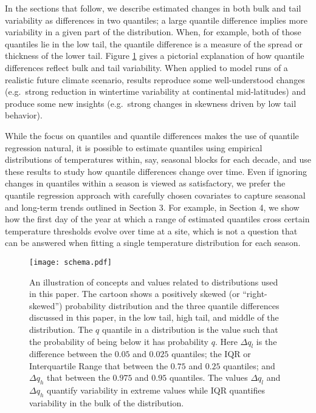 \documentclass{ametsoc}
\newcommand\smallfigwidth{\columnwidth}
\begin{document}
 In the sections that follow, we describe estimated changes in both bulk and tail variability as differences in two quantiles; a large quantile difference implies more variability in a given part of the distribution. 
When, for example, both of those quantiles lie in the low tail, the quantile difference is a measure of the spread or thickness of the lower tail.
 Figure \ref{schema} gives a pictorial explanation of how quantile differences reflect bulk and tail variability.
When applied to model runs of a realistic future climate scenario, results reproduce some well-understood changes (e.g.\ strong reduction in wintertime variability at continental mid-latitudes) and produce some new insights (e.g.\ strong changes in skewness driven by low tail behavior). 

{While the focus on quantiles and quantile differences makes the use of quantile regression natural, it is possible to estimate quantiles using empirical distributions of temperatures within, say, seasonal blocks for each decade, and use these results to study how quantile differences change over time.  Even if ignoring changes in quantiles within a season is viewed as satisfactory, we prefer the quantile regression approach with carefully chosen covariates to capture seasonal and long-term trends outlined in Section 3.  For example, in Section 4, we show how the first day of the year at which a range of estimated quantiles cross certain temperature thresholds evolve over time at a site, which is not a question that can be answered when fitting a single temperature distribution for each season.}


\begin{figure} 
\texttt{[image: schema.pdf]}
\caption{\small{An illustration of concepts and values related to distributions used in this paper. The cartoon shows a positively skewed (or ``right-skewed'') probability distribution and the three quantile differences discussed in this paper, in the low tail, high tail, and middle of the distribution. 
The $q$ quantile in a distribution is the value such that the probability of being below it has probability $q$. Here $\Delta q_{l}$ is the difference between the $0.05$ and $0.025$ quantiles; the IQR or Interquartile Range that between the $0.75$ and $0.25$ quantiles; and $\Delta q_{h}$ that between the $0.975$ and $0.95$ quantiles. The values $\Delta q_{l}$ and $\Delta q_{h}$ quantify variability in extreme values while IQR quantifies variability in the bulk of the distribution.
}}            %
\label{schema}          %
\end{figure}
\end{document}
